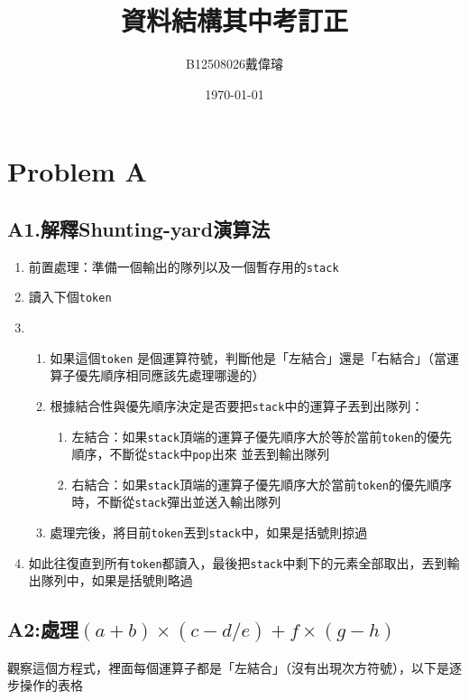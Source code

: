 \documentclass[12pt,a4paper]{article}
\title{資料結構其中考訂正}
\author{B12508026戴偉璿}
\date{\today}
\begin{document}
\maketitle

\newpage

\section*{Problem A}

\subsection*{A1.解釋Shunting-yard演算法}
\begin{enumerate}
    \item 前置處理：準備一個輸出的隊列以及一個暫存用的\texttt{stack}
    \item 讀入下個\texttt{token}
    \item 
    \begin{enumerate}
        \item 如果這個\texttt{token} 是個運算符號，判斷他是「左結合」還是「右結合」（當運算子優先順序相同應該先處理哪邊的）
        \item 根據結合性與優先順序決定是否要把\texttt{stack}中的運算子丟到出隊列：
        \begin{enumerate}
            \item 左結合：如果\texttt{stack}頂端的運算子優先順序大於等於當前\texttt{token}的優先順序，不斷從\texttt{stack}中\texttt{pop}出來
            並丟到輸出隊列
            \item 右結合：如果\texttt{stack}頂端的運算子優先順序大於當前\texttt{token}的優先順序時，不斷從\texttt{stack}彈出並送入輸出隊列
        \end{enumerate}
        \item 處理完後，將目前\texttt{token}丟到\texttt{stack}中，如果是括號則掠過
    \end{enumerate}
    \item 如此往復直到所有\texttt{token}都讀入，最後把\texttt{stack}中剩下的元素全部取出，丟到輸出隊列中，如果是括號則略過
\end{enumerate}
\newpage
\subsection*{A2:處理$(a+b)\times(c-d/e)+f\times(g-h)$}

觀察這個方程式，裡面每個運算子都是「左結合」（沒有出現次方符號），以下是逐步操作的表格
\vspace{0.2cm}
\end{document}
